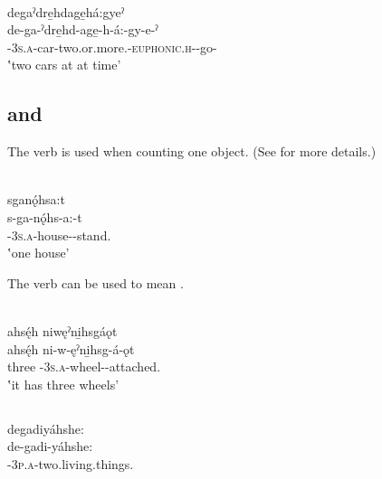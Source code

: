 \newpage

\ea\label{ex:countingdict12}  \\
degaˀdre̱hdage̱há:gyeˀ \\
\gll de-ga-ˀdre̱hd-age̱-h-á:-gy-e-ˀ\\
\textsc{{\dualic}-3s.a}-car-two.or.more.\textsc{{\stative}-euphonic.h-{\progressive}}-go-{\stative}\\
\glt ‛two cars at at time'
\z



\subsection{  and  } \label{[-d] standing and [-ǫd] be attached}
The verb   is used when counting one object. (See  for more details.)

\ea\label{ex:countingdict13}  \\
sganǫ́hsa:t \\
\gll s-ga-nǫ́hs-a:-t \\
\textsc{{\repetitive}-3s.a}-house-{\joinerA}-stand.{\stative}\\
\glt ‛one house'
\z


The verb   can be used to mean .

\ea\label{ex:countingdict14}  \\
ahsę́h niwęˀni̱hsgáǫt\\
\gll ahsę́h ni-w-ęˀni̱hsg-á-ǫt\\
three \textsc{{\partitive}-3s.a}-wheel-{\joinerA}-attached.{\stative}\\
\glt ‛it has three wheels'
\z


\subsection{ } \label{[A…-yahshe:] two living things}
\ea\label{ex:countingdict15}
\ea degadiyáhshe: \\
\gll de-gadi-yáhshe: \\
\textsc{{\dualic}-3p.a}-two.living.things.{\stative}\\

